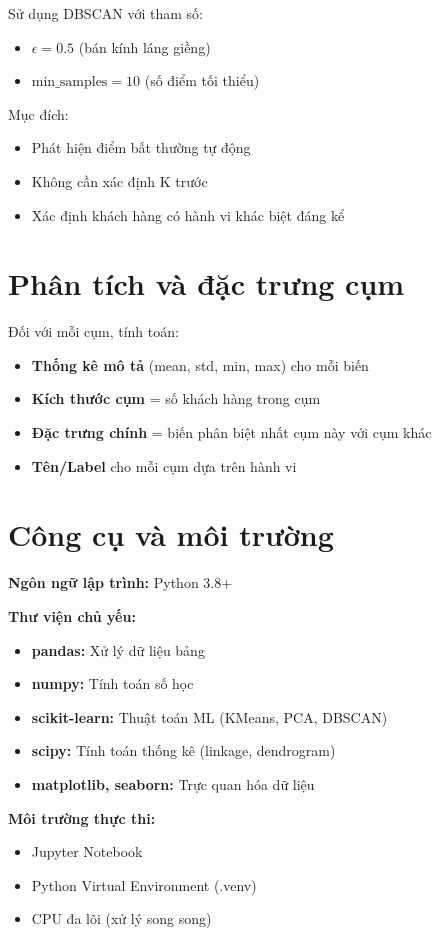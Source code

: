 Sử dụng DBSCAN với tham số:
\begin{itemize}
    \item $\epsilon = 0.5$ (bán kính láng giềng)
    \item $\text{min\_samples} = 10$ (số điểm tối thiểu)
\end{itemize}

Mục đích:
\begin{itemize}
    \item Phát hiện điểm bất thường tự động
    \item Không cần xác định K trước
    \item Xác định khách hàng có hành vi khác biệt đáng kể
\end{itemize}

\section{Phân tích và đặc trưng cụm}

Đối với mỗi cụm, tính toán:
\begin{itemize}
    \item \textbf{Thống kê mô tả} (mean, std, min, max) cho mỗi biến
    \item \textbf{Kích thước cụm} = số khách hàng trong cụm
    \item \textbf{Đặc trưng chính} = biến phân biệt nhất cụm này với cụm khác
    \item \textbf{Tên/Label} cho mỗi cụm dựa trên hành vi
\end{itemize}

\section{Công cụ và môi trường}

\textbf{Ngôn ngữ lập trình:} Python 3.8+

\textbf{Thư viện chủ yếu:}
\begin{itemize}
    \item \textbf{pandas:} Xử lý dữ liệu bảng
    \item \textbf{numpy:} Tính toán số học
    \item \textbf{scikit-learn:} Thuật toán ML (KMeans, PCA, DBSCAN)
    \item \textbf{scipy:} Tính toán thống kê (linkage, dendrogram)
    \item \textbf{matplotlib, seaborn:} Trực quan hóa dữ liệu
\end{itemize}

\textbf{Môi trường thực thi:} 
\begin{itemize}
    \item Jupyter Notebook
    \item Python Virtual Environment (.venv)
    \item CPU đa lõi (xử lý song song)
\end{itemize}
